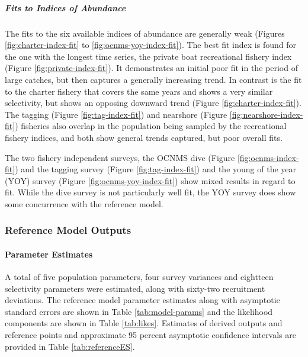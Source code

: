 \documentclass[11pt,
  letterpaper,
]{article}
\begin{document}
\hypertarget{fits-to-indices-of-abundance}{%
\subparagraph{Fits to Indices of Abundance}\label{fits-to-indices-of-abundance}}

The fits to the six available indices of abundance are generally weak (Figures \ref{fig:charter-index-fit} to \ref{fig:ocnms-yoy-index-fit}). The best fit index is found for the one with the longest time series, the private boat recreational fishery index (Figure \ref{fig:private-index-fit}). It demonstrates an initial poor fit in the period of large catches, but then captures a generally increasing trend. In contrast is the fit to the charter fishery that covers the same years and shows a very similar selectivity, but shows an opposing downward trend (Figure \ref{fig:charter-index-fit}). The tagging (Figure \ref{fig:tag-index-fit}) and nearshore (Figure \ref{fig:nearshore-index-fit}) fisheries also overlap in the population being sampled by the recreational fishery indices, and both show general trends captured, but poor overall fits.

The two fishery independent surveys, the OCNMS dive (Figure \ref{fig:ocnms-index-fit}) and the tagging survey (Figure \ref{fig:tag-index-fit}) and the young of the year (YOY) survey (Figure \ref{fig:ocnms-yoy-index-fit}) show mixed results in regard to fit. While the dive survey is not particularly well fit, the YOY survey does show some concurrence with the reference model.

\hypertarget{reference-model-outputs}{%
\subsubsection{Reference Model Outputs}\label{reference-model-outputs}}

\hypertarget{parameter-estimates}{%
\paragraph{Parameter Estimates}\label{parameter-estimates}}

A total of five population parameters, four survey variances and eightteen selectivity parameters were estimated, along with sixty-two recruitment deviations. The reference model parameter estimates along with asymptotic standard errors are shown in Table \ref{tab:model-params} and the likelihood components are shown in Table \ref{tab:likes}. Estimates of derived outputs and reference points and approximate 95 percent asymptotic confidence intervals are provided in Table \ref{tab:referenceES}.
\end{document}

